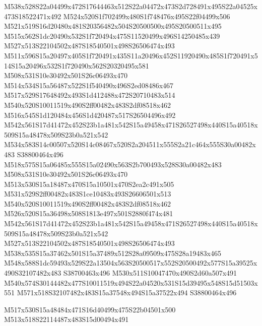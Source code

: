 \documentclass{article}
\begin{document}
\begin{multicols}{2}
M538x528S22a04499x472S17644463x512S22a04472x473S2d728491x495S22a04525x473S18522471x492 M524x520S1f702499x480S1f748476x495S22f04499x506 M521x519S16d20480x481S20356482x504S20500500x495S20500511x495 M515x562S1dc20490x532S1f720494x475S11520499x496S14250485x439 M527x513S22104502x487S18540501x498S26506474x493 M511x596S15a20497x405S1f720491x435S11a20496x452S11920490x485S1f720491x514S15a20496x532S1f720490x562S20320495x581 M508x531S10e30492x501S26c06493x470 M514x534S15a56487x522S1f540490x496S2ed08486x467 M517x529S17648492x493S1d412488x472S20710483x514 M540x520S10011519x490S2ff00482x483S2df08518x462 M516x545S1d120484x456S1d420487x517S26504496x492 M542x561S17d41472x452S23b1a481x542S15a49458x471S26527498x440S15a40518x509S15a48478x509S23b0a521x542 M534x583S14c00507x520S14c08467x520S2a204511x555S2a21c464x555S30a00482x483 S38800464x496 M518x575S15a06485x555S15a02490x563S2b700493x528S30a00482x483 M508x531S10e30492x501S26c06493x470 M513x530S15a18487x470S15a10501x470S2ea2c491x505 M531x529S2ff00482x483S1ce10483x493S26606501x513 M540x520S10011519x490S2ff00482x483S2df08518x462 M526x520S15a36498x508S1813e497x501S2880f474x481 M542x561S17d41472x452S23b1a481x542S15a49458x471S26527498x440S15a40518x509S15a48478x509S23b0a521x542 M527x513S22104502x487S18540501x498S26506474x493 M538x535S15a37462x501S15a37489x512S28a09509x475S28a19483x465 M548x588S1dc59493x529S22a13504x563S20500517x552S20500492x577S15a39525x490S32107482x483 S38700463x496 M530x511S10047470x490S2d60a507x491 M540x574S30144482x477S10011519x494S22a04520x531S15d39495x548S15d51503x551 M571x518S32107482x483S15a37548x494S15a37522x494 S38800464x496






\begin{center}
M517x530S15a48484x471S16d40499x475S22b04501x500 M513x518S22114487x483S15d00494x491 
\end{center}



\end{multicols}
\end{document}
